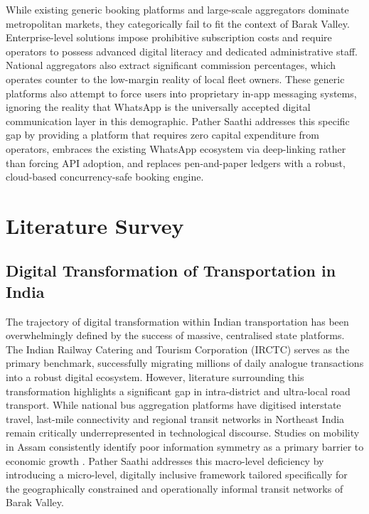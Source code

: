 \documentclass[12pt,a4paper]{report}
\begin{document}
While existing generic booking platforms and large-scale aggregators dominate metropolitan markets, they categorically fail to fit the context of Barak Valley. Enterprise-level solutions impose prohibitive subscription costs and require operators to possess advanced digital literacy and dedicated administrative staff. National aggregators also extract significant commission percentages, which operates counter to the low-margin reality of local fleet owners. These generic platforms also attempt to force users into proprietary in-app messaging systems, ignoring the reality that WhatsApp is the universally accepted digital communication layer in this demographic. Pather Saathi addresses this specific gap by providing a platform that requires zero capital expenditure from operators, embraces the existing WhatsApp ecosystem via deep-linking rather than forcing API adoption, and replaces pen-and-paper ledgers with a robust, cloud-based concurrency-safe booking engine.

\chapter{Literature Survey}

\section{Digital Transformation of Transportation in India}
The trajectory of digital transformation within Indian transportation has been overwhelmingly defined by the success of massive, centralised state platforms. The Indian Railway Catering and Tourism Corporation (IRCTC) serves as the primary benchmark, successfully migrating millions of daily analogue transactions into a robust digital ecosystem. However, literature surrounding this transformation highlights a significant gap in intra-district and ultra-local road transport. While national bus aggregation platforms have digitised interstate travel, last-mile connectivity and regional transit networks in Northeast India remain critically underrepresented in technological discourse. Studies on mobility in Assam consistently identify poor information symmetry as a primary barrier to economic growth \cite{indicative1}. Pather Saathi addresses this macro-level deficiency by introducing a micro-level, digitally inclusive framework tailored specifically for the geographically constrained and operationally informal transit networks of Barak Valley.
\end{document}
